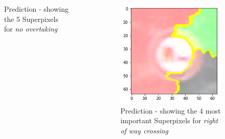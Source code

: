 \begin{frame}
\begin{columns}
\begin{column}{0.33\textwidth}
\begin{center}
\begin{figure}[H]
					\caption[Prediction:  No Overtaking]{ Prediction - showing the 5 Superpixels for \textit{no overtaking}}
					\label{fig:noovertakingCorrect}
				\end{figure}
			\end{center}
		\end{column}
		\begin{column}{0.33\textwidth}
		\begin{center}
			\begin{figure}[H]
				\includegraphics[width=0.9\linewidth]{Images/NoOvertakingFalseClass}
				\caption[Prediction:  right of way crossing]{ Prediction - showing the 4 most important Superpixels for \textit{right of way crossing}}
				\label{fig:noovertakingFalse}
			\end{figure}
		\end{center}
		\end{column}
	\end{columns}
\end{frame}

